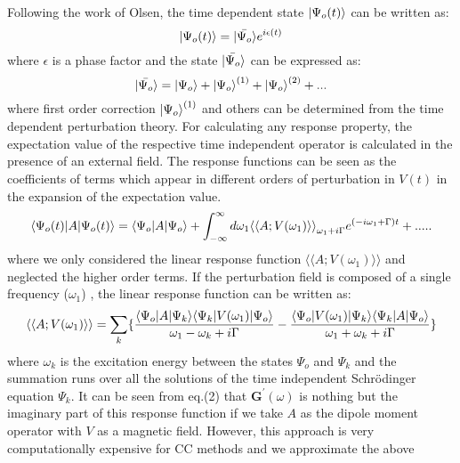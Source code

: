 Following the work of Olsen\cite{Olsen85}, the time dependent state $| \Psi_o(t) \rangle$
can be written as:
\begin{equation}
| \Psi_o(t) \rangle = | \bar{\Psi_o} \rangle e^{i\epsilon(t)}
\end{equation}
where $\epsilon$ is a phase factor and the state $| \bar{\Psi_o} \rangle$ can be expressed as\cite{Koch90}:
\begin{equation}
| \bar{\Psi_o} \rangle = | \Psi_o \rangle + {| \Psi_o \rangle}^{(1)}+ {| \Psi_o \rangle}^{(2)} + ...
\end{equation}
where first order correction ${| \Psi_o \rangle}^{(1)}$ and others can be determined 
from the time dependent perturbation theory. For calculating any response property, the
expectation value of the respective time independent  operator is calculated in
the presence of an external field. The response functions can be seen as the
coefficients of terms which appear in different orders of perturbation in $V(t)$
in the expansion of the expectation value.\cite{Koch90} 
\begin{equation}
\langle \Psi_o(t) |A| \Psi_o(t) \rangle = \langle \Psi_o |A| \Psi_o \rangle + \int_{-\infty}^{\infty}d\omega_1{\langle\langle A;V({\omega_1})\rangle\rangle}_{\omega_1 + i\Gamma}e^{(-i\omega_1 + \Gamma)t} + .....
\end{equation}
where we only considered the linear response function $\langle\langle A;V({\omega_1})\rangle\rangle$ 
and neglected the higher order terms. If the perturbation field is composed of a 
single frequency ($\omega_1$) , the linear response function can be written as:
\begin{equation}
\langle\langle A;V({\omega_1})\rangle\rangle = \sum_k\{
\frac{\langle \Psi_o |A| \Psi_k \rangle\langle \Psi_k |V({\omega_1})| \Psi_o \rangle}{\omega_1
- \omega_k + i\Gamma}  -
\frac{\langle \Psi_o |V({\omega_1})| \Psi_k \rangle\langle \Psi_k |A| \Psi_o \rangle}{\omega_1 + \omega_k +
i\Gamma}\} \end{equation}
where $\omega_k$ is the excitation energy between the states $\Psi_o$ and $\Psi_k$ 
and the summation runs over all the solutions of the time independent Schr\"odinger equation $\Psi_k$.
It can be seen from eq.(2) that $\textbf{G}^{\prime}(\omega)$ is nothing but the imaginary part of this 
response function if we take $A$ as the dipole moment operator with $V$ as a magnetic field.
However, this approach is very computationally expensive for CC methods and we approximate the above 
